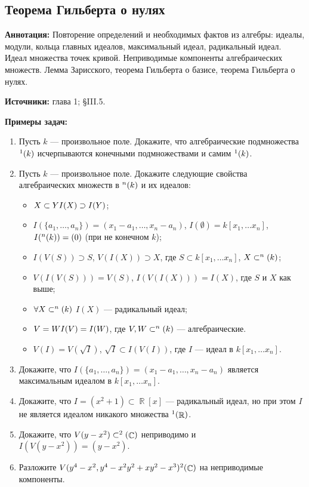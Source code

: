 \documentclass[a4paper, 12pt]{article}
\let\iff\relax
\DeclareMathOperator{\iff}{\Leftrightarrow}
\let\implies\relax
\DeclareMathOperator{\implies}{\Rightarrow}
\DeclareMathOperator{\RR}{\mathbb{R}}
\DeclareMathOperator{\CC}{\mathbb{C}}
\let\AA\relax
\DeclareMathOperator{\AA}{\mathbb{A}}
\begin{document}
\subsection{Теорема Гильберта о нулях}

{\bf Аннотация:} Повторение определений и необходимых фактов из алгебры: идеалы, модули, кольца главных идеалов, максимальный идеал, радикальный идеал. Идеал множества точек кривой. Неприводимые компоненты алгебраических множеств. Лемма Зарисского, теорема Гильберта о базисе, теорема Гильберта о нулях.

{\bf Источники:} \cite{Fult} глава 1; \cite{Mir} \S III.5.

{\bf Примеры задач:}
\begin{enumerate}[noitemsep,topsep=0pt]
    
    \item Пусть $k$ --- произвольное поле. Докажите, что алгебраические подмножества $\AA^1(k)$ исчерпываются конечными подмножествами и самим $\AA^1(k)$. %
    \item Пусть $k$ --- произвольное поле. Докажите следующие свойства алгебраических множеств в $\AA^n(k)$ и их идеалов: 
    \begin{itemize}[noitemsep,topsep=0pt]
        \item $X \subset Y \implies I(X) \supset I(Y)$;
        \item $I(\{a_1, \dots, a_n\}) = (x_1-a_1, \dots, x_n-a_n)$, $I(\emptyset) = k[x_1, \dots x_n]$, $I(\AA^n(k)) = (0)$ (при не конечном $k$);
        \item $I(V(S)) \supset S$, $V(I(X)) \supset X$, где $S \subset k[x_1, \dots x_n]$, $X \subset \AA^n(k)$;
        \item $V(I(V(S))) = V(S)$, $I(V(I(X))) = I(X)$, где $S$ и $X$ как выше;
        \item $\forall X \subset \AA^n(k)$ $I(X)$ --- радикальный идеал;
        \item $V = W \iff I(V)=I(W)$, где $V,W \subset \AA^n(k)$ --- алгебраические. 
        \item $V(I) = V(\sqrt{I})$, $\sqrt{I} \subset I(V(I))$, где $I$ --- идеал в $k[x_1, \dots x_n]$.
    \end{itemize}
    \item Докажите, что $I(\{a_1, \dots, a_n\}) = (x_1-a_1, \dots, x_n-a_n)$ является максимальным идеалом в $k[x_1, \dots x_n]$. %
    \item Докажите, что $I=(x^2+1) \subset \RR[x]$ --- радикальный идеал, но при этом $I$ не является идеалом никакого множества $\AA^1(\RR)$. %
    \item Докажите, что $V(y-x^2)\subset \AA^2(\CC)$ неприводимо и $I(V(y-x^2)) = (y-x^2)$. %
    \item Разложите $V(y^4-x^2, y^4-x^2y^2+xy^2-x^3) \AA^2(\CC)$ на неприводимые компоненты. %
\end{enumerate}
\end{document}

